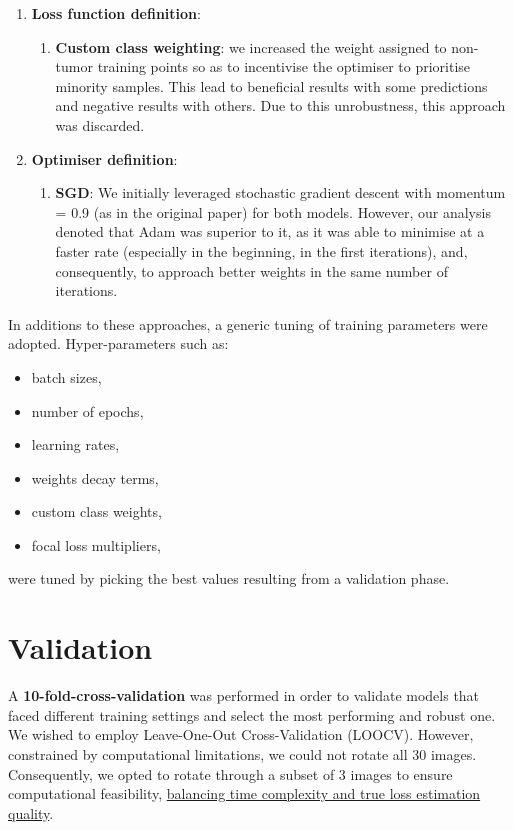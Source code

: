 \begin{enumerate}
        
    \item \textbf{Loss function definition}:
    \begin{enumerate}
        \item \textbf{Custom class weighting}:
        we increased the weight assigned to non-tumor training points so as to incentivise the optimiser to prioritise minority samples.
        This lead to beneficial results with some predictions and negative results with others. Due to this unrobustness, this approach was discarded.
    \end{enumerate}

    \item \textbf{Optimiser definition}:
    \begin{enumerate}
        \item \textbf{SGD}:
        We initially leveraged stochastic gradient descent with momentum = 0.9 (as in the original paper) for both models. However, our analysis denoted that Adam was superior to it, as it was able to minimise at a faster rate (especially in the beginning, in the first iterations), and, consequently, to approach better weights in the same number of iterations.
    \end{enumerate}
    
\end{enumerate}

In additions to these approaches, a generic tuning of training parameters were adopted.
Hyper-parameters such as:
\begin{itemize}
    \item batch sizes,
    \item number of epochs,
    \item learning rates,
    \item weights decay terms,
    \item custom class weights,
    \item focal loss multipliers,
\end{itemize}

were tuned by picking the best values resulting from a validation phase.

\section{Validation}
\label{sec:validation}

\par
A \textbf{10-fold-cross-validation} was performed in order to validate models that faced different training settings and select the most performing and robust one.
We wished to employ Leave-One-Out Cross-Validation (LOOCV). However, constrained by computational limitations, we could not rotate all 30 images. Consequently, we opted to rotate through a subset of 3 images to ensure computational feasibility, \uline{balancing time complexity and true loss estimation quality}.

